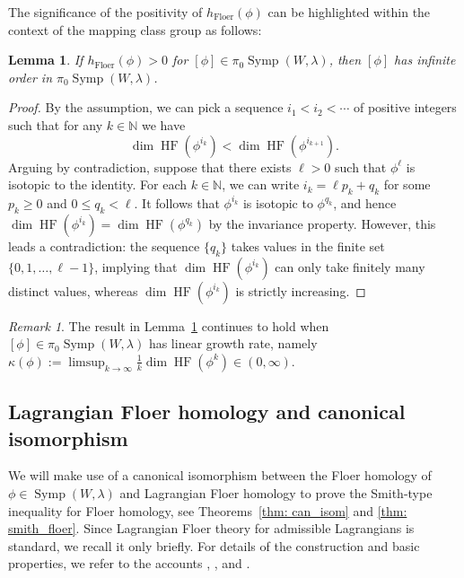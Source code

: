 \documentclass[12pt]{article}
\renewcommand{\le}{\leqslant}
\renewcommand{\ge}{\geqslant}
\theoremstyle{theorem}
\newtheorem{lemma}[theorem]{Lemma}
\theoremstyle{definition}
\theoremstyle{remark}
\newtheorem{remark}[theorem]{Remark}
\numberwithin{equation}{section}
\newcommand{\N}{{\mathbb{N}}}
\DeclareMathOperator{\floer}{Floer}
\DeclareMathOperator{\Symp}{Symp}
\DeclareMathOperator{\HF}{HF}
\begin{document}
The significance of the positivity of $h_{\floer}(\phi)$ can be highlighted within the context of the mapping class group as follows:
\begin{lemma}\label{lem: entropy_infinite}
If $h_{\floer}(\phi)>0$ for $[\phi]\in \pi_0\Symp(W,\lambda)$, then $[\phi]$ has infinite order in $\pi_0\Symp(W,\lambda)$.
\end{lemma}
\begin{proof}
By the assumption, we can pick a sequence $i_1<i_2<\cdots$ of positive integers such that for any $k\in \N$ we have
$$
\dim \HF(\phi^{i_k})<\dim \HF(\phi^{i_{k+1}}).
$$
Arguing by contradiction, suppose that there exists $\ell>0$ such that $\phi^\ell$ is isotopic to the identity.
For each $k\in \N$, we can write $i_k=\ell p_k +q_k$ for some $p_k\ge 0$ and $0\le q_k<\ell$.
It follows that $\phi^{i_k}$ is isotopic to $\phi^{q_k}$, and hence $\dim \HF(\phi^{i_k})=\dim \HF(\phi^{q_k})$ by the invariance property.
However, this leads a contradiction: the sequence $\{q_k\}$ takes values in the finite set $\{0,1,\dots,\ell-1\}$, implying that $\dim \HF(\phi^{i_k})$ can only take finitely many distinct values, whereas $\dim \HF(\phi^{i_k})$ is strictly increasing.
\end{proof}
\begin{remark}\label{rem: linear_infinite}
The result in Lemma~\ref{lem: entropy_infinite} continues to hold when $[\phi]\in\pi_0\Symp(W,\lambda)$ has linear growth rate, namely $\displaystyle\kappa(\phi):=\limsup_{k\to \infty}\frac{1}{k}\dim \HF(\phi^k) \in (0,\infty)$.
\end{remark}


\subsection{Lagrangian Floer homology and canonical isomorphism}\label{sec: lagrfloer}
We will make use of a canonical isomorphism between the Floer homology of $\phi\in\Symp(W,\lambda)$ and Lagrangian Floer homology to prove the Smith-type inequality for Floer homology, see Theorems~\ref{thm: can_isom} and \ref{thm: smith_floer}.
Since Lagrangian Floer theory for admissible Lagrangians is standard, we recall it only briefly.
For details of the construction and basic properties, we refer to the accounts \cite[Section~5]{KhSe02}, \cite[Section~3.1]{SS}, and \cite[Section~2.1]{KKL18}.
\end{document}

